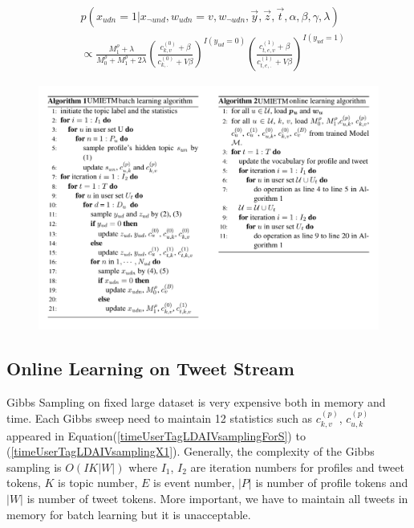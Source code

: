 \documentclass{llncs}
\begin{document}
\begin{scriptsize}
\begin{equation}
\label{timeUserTagLDAIVsamplingX1}
\begin{aligned}
&p(x_{udn}=1|x_{\neg{und}},w_{udn}=v,w_{\neg{udn}},\vec{y},\vec{z},\vec{t},\alpha,\beta,\gamma,\lambda)\\
&\propto \frac{M^{\rho}_1+\lambda}{M^{\rho}_0+M^{\rho}_1+2\lambda} (\frac{c_{k,v}^{(0)}+\beta}{c_{k,.}^{(0)}+V\beta})^{I(y_{ud}=0)}(\frac{c_{t,e,v}^{(1)}+\beta}{c_{t,e,.}^{(1)}+V\beta})^{I(y_{ud}=1)}
\end{aligned}
\end{equation}
\end{scriptsize}

\begin{figure}
    \label{fig:algorithm}
    \includegraphics[width=1.0\textwidth]{img/algorithm.pdf}
\end{figure}


\subsection{Online Learning on Tweet Stream}\label{subsec:online}
Gibbs Sampling on fixed large dataset is very expensive both in memory and time.
Each Gibbs sweep need to maintain 12 statistics such as \(c^{(p)}_{k,v}\), \(c^{(p)}_{u,k}\) appeared in Equation(\ref{timeUserTagLDAIVsamplingForS}) to (\ref{timeUserTagLDAIVsamplingX1}).
Generally, the complexity of the Gibbs sampling is \(O(IK|W|)\) where \(I_1\), \(I_2\) are iteration numbers for profiles and tweet tokens, \(K\) is topic number, \(E\) is event number, \(|P|\) is number of profile tokens and \(|W|\) is number of tweet tokens.
More important, we have to maintain all tweets in memory for batch learning but it is unacceptable.
\end{document}
